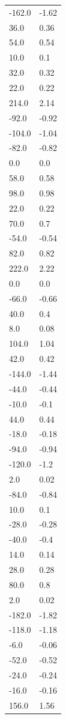 \begin{longtable}{ll}
-162.0 & -1.62 \\
36.0 & 0.36 \\
54.0 & 0.54 \\
10.0 & 0.1 \\
32.0 & 0.32 \\
22.0 & 0.22 \\
214.0 & 2.14 \\
-92.0 & -0.92 \\
-104.0 & -1.04 \\
-82.0 & -0.82 \\
0.0 & 0.0 \\
58.0 & 0.58 \\
98.0 & 0.98 \\
22.0 & 0.22 \\
70.0 & 0.7 \\
-54.0 & -0.54 \\
82.0 & 0.82 \\
222.0 & 2.22 \\
0.0 & 0.0 \\
-66.0 & -0.66 \\
40.0 & 0.4 \\
8.0 & 0.08 \\
104.0 & 1.04 \\
42.0 & 0.42 \\
-144.0 & -1.44 \\
-44.0 & -0.44 \\
-10.0 & -0.1 \\
44.0 & 0.44 \\
-18.0 & -0.18 \\
-94.0 & -0.94 \\
-120.0 & -1.2 \\
2.0 & 0.02 \\
-84.0 & -0.84 \\
10.0 & 0.1 \\
-28.0 & -0.28 \\
-40.0 & -0.4 \\
14.0 & 0.14 \\
28.0 & 0.28 \\
80.0 & 0.8 \\
2.0 & 0.02 \\
-182.0 & -1.82 \\
-118.0 & -1.18 \\
-6.0 & -0.06 \\
-52.0 & -0.52 \\
-24.0 & -0.24 \\
-16.0 & -0.16 \\
156.0 & 1.56 \\

\end{longtable}
